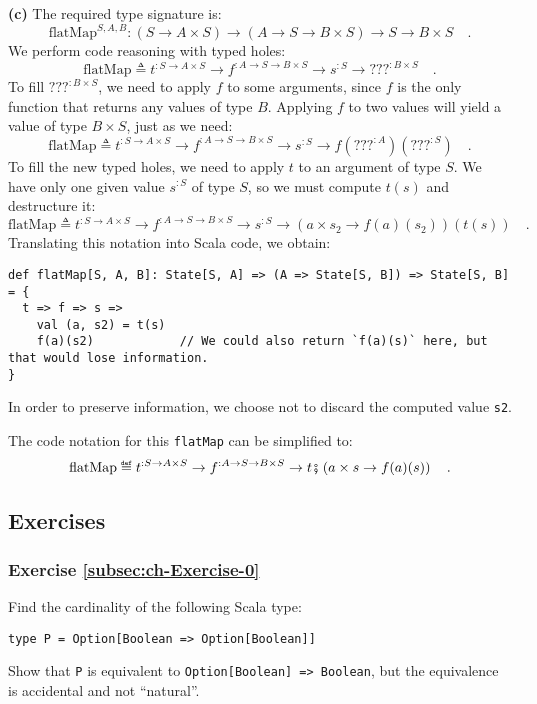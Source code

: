 \textbf{(c)} The required type signature is:
\[
\text{flatMap}^{S,A,B}:(S\rightarrow A\times S)\rightarrow(A\rightarrow S\rightarrow B\times S)\rightarrow S\rightarrow B\times S\quad.
\]
We perform code reasoning with typed holes:
\[
\text{flatMap}\triangleq t^{:S\rightarrow A\times S}\rightarrow f^{:A\rightarrow S\rightarrow B\times S}\rightarrow s^{:S}\rightarrow\text{???}^{:B\times S}\quad.
\]
To fill $\text{???}^{:B\times S}$, we need to apply $f$ to some
arguments, since $f$ is the only function that returns any values
of type $B$. Applying $f$ to two values will yield a value of type
$B\times S$, just as we need:
\[
\text{flatMap}\triangleq t^{:S\rightarrow A\times S}\rightarrow f^{:A\rightarrow S\rightarrow B\times S}\rightarrow s^{:S}\rightarrow f(\text{???}^{:A})(\text{???}^{:S})\quad.
\]
To fill the new typed holes, we need to apply $t$ to an argument
of type $S$. We have only one given value $s^{:S}$ of type $S$,
so we must compute $t(s)$ and destructure it:
\[
\text{flatMap}\triangleq t^{:S\rightarrow A\times S}\rightarrow f^{:A\rightarrow S\rightarrow B\times S}\rightarrow s^{:S}\rightarrow\left(a\times s_{2}\rightarrow f(a)(s_{2})\right)(t(s))\quad.
\]
Translating this notation into Scala code, we obtain:
\begin{lstlisting}
def flatMap[S, A, B]: State[S, A] => (A => State[S, B]) => State[S, B] = {
  t => f => s =>
    val (a, s2) = t(s)
    f(a)(s2)            // We could also return `f(a)(s)` here, but that would lose information.
}
\end{lstlisting}
In order to preserve information, we choose not to discard the computed
value \lstinline!s2!.

The code notation for this \lstinline!flatMap! can be simplified
to:
\[
\text{flatMap}\triangleq t^{:S\rightarrow A\times S}\rightarrow f^{:A\rightarrow S\rightarrow B\times S}\rightarrow t\bef\left(a\times s\rightarrow f(a)(s)\right)\quad.
\]


\subsection{Exercises}

\subsubsection{Exercise \label{subsec:ch-Exercise-0}\ref{subsec:ch-Exercise-0}}

Find the cardinality of the following Scala type: 
\begin{lstlisting}
type P = Option[Boolean => Option[Boolean]]
\end{lstlisting}
Show that \lstinline!P! is equivalent to \lstinline!Option[Boolean] => Boolean!,
but the equivalence is accidental
and not \textsf{``}natural\textsf{''}.

